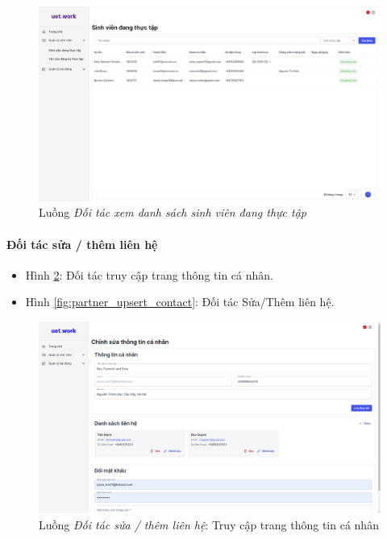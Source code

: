 \documentclass[./../main.tex]{subfiles}
\begin{document}
\begin{figure}[]
	\includegraphics[width=\linewidth]{./images/image9.png}
	\caption{Luồng \emph{Đối tác xem danh sách sinh viên đang thực tập}}
	\label{fig:partner_view_list_working_students_page}
\end{figure}

\paragraph*{Đối tác sửa / thêm liên hệ}

\begin{itemize}
	\item Hình \ref{fig:partner_info_page}: Đối tác truy cập trang thông tin cá nhân.
	\item Hình \ref{fig:partner_upsert_contact}: Đối tác Sửa/Thêm liên hệ.
\end{itemize}

\begin{figure}[]
	\includegraphics[width=\linewidth]{./images/image48-1.png}
	\caption{Luồng \emph{Đối tác sửa / thêm liên hệ}: Truy cập trang thông tin cá nhân}
	\label{fig:partner_info_page}
\end{figure}
\end{document}
